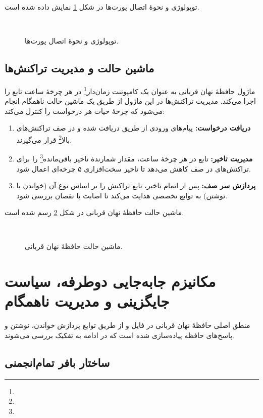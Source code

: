 توپولوژی و نحوهٔ اتصال پورت‌ها در شکل \ref{topology} نمایش داده شده است.
\begin{figure}[ht]
	‫
	\caption{توپولوژی و نحوهٔ اتصال پورت‌ها.}
	\label{topology}
\end{figure}


\subsection{ماشین حالت و مدیریت تراکنش‌ها}

ماژول حافظهٔ نهان قربانی به عنوان یک کامپوننت زمان‌دار\footnote{} در هر چرخهٔ ساعت تابع  را اجرا می‌کند. مدیریت تراکنش‌ها در این ماژول از طریق یک ماشین حالت ناهمگام انجام می‌شود که چرخهٔ حیات هر درخواست را کنترل می‌کند:
\begin{enumerate}
	\item \textbf{دریافت درخواست:} پیام‌های ورودی از طریق  دریافت شده و در صف تراکنش‌های بالا\footnote{} قرار می‌گیرند.
	\item \textbf{مدیریت تاخیر:} تابع  در هر چرخهٔ ساعت، مقدار شمارندهٔ تاخیر باقی‌مانده\footnote{} را برای تراکنش‌های در صف کاهش می‌دهد تا تاخیر سخت‌افزاری ۵ چرخه‌ای اعمال شود.
	\item \textbf{پردازش سر صف:} پس از اتمام تاخیر، تابع  تراکنش را بر اساس نوع آن (خواندن یا نوشتن) به توابع تخصصی هدایت می‌کند تا اصابت یا نقصان بررسی شود.
\end{enumerate}

ماشین حالت حافظهٔ نهان قربانی در شکل \ref{fsm} رسم شده است.

\begin{figure}[ht]
	‫
	\caption{ماشین حالت حافظهٔ نهان قربانی.}
	\label{fsm}
\end{figure}




\section{مکانیزم جابه‌جایی دوطرفه، سیاست جایگزینی و مدیریت ناهمگام}

منطق اصلی حافظهٔ نهان قربانی در فایل  و از طریق توابع پردازش خواندن، نوشتن و پاسخ‌های حافظه پیاده‌سازی شده است که در ادامه به تفکیک بررسی می‌شوند.

\subsection{ساختار بافر تمام‌انجمنی}

